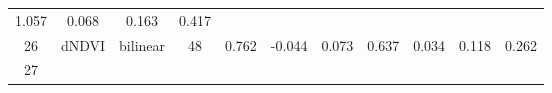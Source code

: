 \documentclass[twoside,12pt,final]{ucthesis-CA2012}
\begin{document}
\begin{ucmainmatter}
\begin{longtable}[]{@{}ccccccccccc@{}}
\begin{minipage}[t]{0.07\columnwidth}
1.057\strut
\end{minipage} & \begin{minipage}[t]{0.05\columnwidth}\centering\strut
0.068\strut
\end{minipage} & \begin{minipage}[t]{0.05\columnwidth}\centering\strut
0.163\strut
\end{minipage} & \begin{minipage}[t]{0.05\columnwidth}\centering\strut
0.417\strut
\end{minipage}\tabularnewline
\begin{minipage}[t]{0.04\columnwidth}\centering\strut
26\strut
\end{minipage} & \begin{minipage}[t]{0.11\columnwidth}\centering\strut
dNDVI\strut
\end{minipage} & \begin{minipage}[t]{0.06\columnwidth}\centering\strut
bilinear\strut
\end{minipage} & \begin{minipage}[t]{0.08\columnwidth}\centering\strut
48\strut
\end{minipage} & \begin{minipage}[t]{0.08\columnwidth}\centering\strut
0.762\strut
\end{minipage} & \begin{minipage}[t]{0.07\columnwidth}\centering\strut
-0.044\strut
\end{minipage} & \begin{minipage}[t]{0.07\columnwidth}\centering\strut
0.073\strut
\end{minipage} & \begin{minipage}[t]{0.07\columnwidth}\centering\strut
0.637\strut
\end{minipage} & \begin{minipage}[t]{0.05\columnwidth}\centering\strut
0.034\strut
\end{minipage} & \begin{minipage}[t]{0.05\columnwidth}\centering\strut
0.118\strut
\end{minipage} & \begin{minipage}[t]{0.05\columnwidth}\centering\strut
0.262\strut
\end{minipage}\tabularnewline
\begin{minipage}[t]{0.04\columnwidth}\centering\strut
27\strut
\end{minipage} & \begin{minipage}[t]{0.11\columnwidth}\centering\strut

\end{minipage}
\end{longtable}
\end{ucmainmatter}
\end{document}
